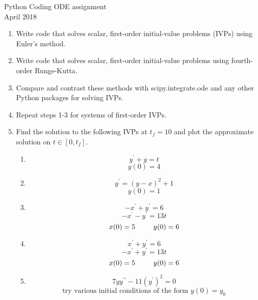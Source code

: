 \documentclass[12pt]{article}
\begin{document}
\pagestyle{empty}
\begin{center}
Python Coding ODE assignment\\[6pt]
April 2018
\end{center}

\bigskip

\begin{enumerate}
    \item{Write code that solves scalar, first-order initial-value problems (IVPs) using Euler's method.}
    \item{Write code that solves scalar, first-order initial-value problems using fourth-order Runge-Kutta.}
    \item{Compare and contrast these methods with scipy.integrate.ode and any other Python packages for solving IVPs.}
    \item{Repeat steps 1-3 for systems of first-order IVPs.}
    \item{Find the solution to the following IVPs at $t_f=10$ and plot the approximate solution on $t\in[0,t_f]$.}
    \begin{enumerate}
        \item{$$y^{\prime}+y=t$$
              $$y(0)=4$$}
        \item{$$y^{\prime}=(y-x)^2+1$$
              $$y(0)=1$$}
        \item{$$-x^{\prime}+y^{\prime}=6$$
              $$-x^{\prime}-y^{\prime}=13t$$
              $$x(0)=5\hspace*{0.9cm}y(0)=6$$}
        \item{$$x^{\prime}+y^{\prime}=6$$
              $$-x^{\prime}+y^{\prime}=13t$$
              $$x(0)=5\hspace*{0.9cm}y(0)=6$$}
        \item{$$7yy^{\prime\prime}-11(y^{\prime})^2=0$$
              $$\text{try various initial conditions of the form $y(0)=y_0$}$$}
    \end{enumerate}
\end{enumerate}
\end{document}
